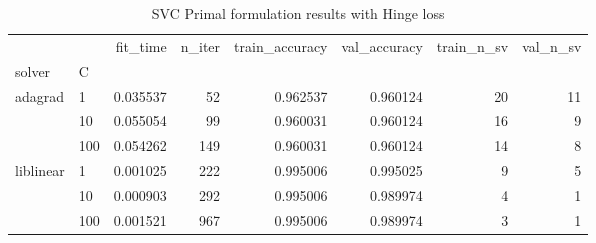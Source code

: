 \begin{table}[h!]
\centering
\caption{SVC Primal formulation results with Hinge loss}
\label{primal_svc_hinge_cv_results}
\begin{tabular}{llrrrrrr}
\toprule
          &     &  fit\_time &  n\_iter &  train\_accuracy &  val\_accuracy &  train\_n\_sv &  val\_n\_sv \\
solver & C &           &         &                 &               &             &           \\
\midrule
adagrad & 1   &  0.035537 &      52 &        0.962537 &      0.960124 &          20 &        11 \\
          & 10  &  0.055054 &      99 &        0.960031 &      0.960124 &          16 &         9 \\
          & 100 &  0.054262 &     149 &        0.960031 &      0.960124 &          14 &         8 \\
liblinear & 1   &  0.001025 &     222 &        0.995006 &      0.995025 &           9 &         5 \\
          & 10  &  0.000903 &     292 &        0.995006 &      0.989974 &           4 &         1 \\
          & 100 &  0.001521 &     967 &        0.995006 &      0.989974 &           3 &         1 \\
\bottomrule
\end{tabular}
\end{table}

